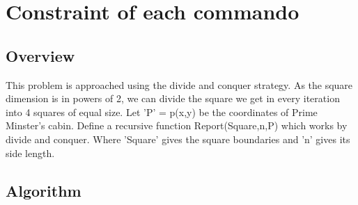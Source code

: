 \documentclass{article}
\begin{document}
\section{Constraint of each commando}
\subsection{Overview}
This problem is approached using the divide and conquer strategy. As the square dimension is in powers of 2, we can divide the square we get in every iteration into 4 squares of equal size. Let 'P' = p(x,y) be the coordinates of Prime Minster's cabin. Define a recursive function Report(Square,n,P) which works by divide and conquer. Where 'Square' gives the square boundaries and 'n' gives its side length. 
\subsection{Algorithm}
\end{document}
